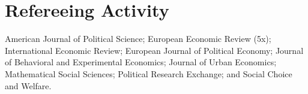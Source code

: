 
\section{Refereeing Activity}

American Journal of Political Science;  European Economic Review (5x); International Economic Review; European Journal of Political Economy; Journal of Behavioral and Experimental Economics; Journal of Urban Economics; Mathematical Social Sciences;  Political Research Exchange; and Social Choice and Welfare.


